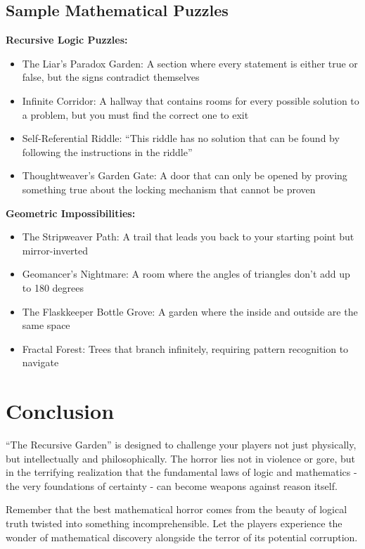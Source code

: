 \documentclass[11pt]{article}
\begin{document}
\subsection{Sample Mathematical Puzzles}

\textbf{Recursive Logic Puzzles:}
\begin{itemize}
\item The Liar's Paradox Garden: A section where every statement is either true or false, but the signs contradict themselves
\item Infinite Corridor: A hallway that contains rooms for every possible solution to a problem, but you must find the correct one to exit
\item Self-Referential Riddle: ``This riddle has no solution that can be found by following the instructions in the riddle''
\item Thoughtweaver's Garden Gate: A door that can only be opened by proving something true about the locking mechanism that cannot be proven
\end{itemize}

\textbf{Geometric Impossibilities:}
\begin{itemize}
\item The Stripweaver Path: A trail that leads you back to your starting point but mirror-inverted
\item Geomancer's Nightmare: A room where the angles of triangles don't add up to 180 degrees
\item The Flaskkeeper Bottle Grove: A garden where the inside and outside are the same space
\item Fractal Forest: Trees that branch infinitely, requiring pattern recognition to navigate
\end{itemize}

\section{Conclusion}

``The Recursive Garden'' is designed to challenge your players not just physically, but intellectually and philosophically. The horror lies not in violence or gore, but in the terrifying realization that the fundamental laws of logic and mathematics - the very foundations of certainty - can become weapons against reason itself.

Remember that the best mathematical horror comes from the beauty of logical truth twisted into something incomprehensible. Let the players experience the wonder of mathematical discovery alongside the terror of its potential corruption.
\end{document}
